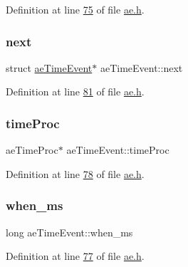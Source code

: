 Definition at line \hyperlink{ae_8h_source_l00075}{75} of file \hyperlink{ae_8h_source}{ae.\+h}.

\mbox{\label{structaeTimeEvent_a9721fa6e2866701e2c38f0020beaac60}} 
\subsubsection{\texorpdfstring{next}{next}}
{\footnotesize\ttfamily struct \hyperlink{structaeTimeEvent}{ae\+Time\+Event}$\ast$ ae\+Time\+Event\+::next}



Definition at line \hyperlink{ae_8h_source_l00081}{81} of file \hyperlink{ae_8h_source}{ae.\+h}.

\mbox{\label{structaeTimeEvent_a149629cdd2633c73cfb56e4570bb43ac}} 
\subsubsection{\texorpdfstring{time\+Proc}{timeProc}}
{\footnotesize\ttfamily ae\+Time\+Proc$\ast$ ae\+Time\+Event\+::time\+Proc}



Definition at line \hyperlink{ae_8h_source_l00078}{78} of file \hyperlink{ae_8h_source}{ae.\+h}.

\mbox{\label{structaeTimeEvent_aa1c543dc2cfc4d17cf3153c78f373635}} 
\subsubsection{\texorpdfstring{when\+\_\+ms}{when\_ms}}
{\footnotesize\ttfamily long ae\+Time\+Event\+::when\+\_\+ms}



Definition at line \hyperlink{ae_8h_source_l00077}{77} of file \hyperlink{ae_8h_source}{ae.\+h}.

\mbox{\label{structaeTimeEvent_a8b8006c68e6af8e1565eda7cbe0ed222}} 

